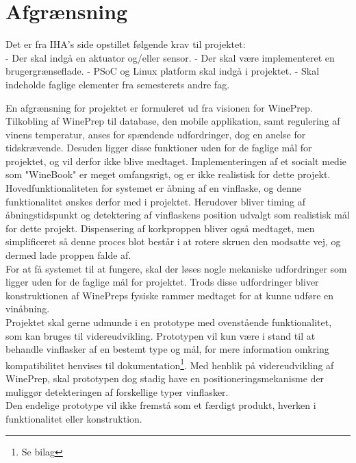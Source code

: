 \chapter{Afgrænsning}
Det er fra IHA's side opstillet følgende krav til projektet:\\
- Der skal indgå en aktuator og/eller sensor.
- Der skal være implementeret en brugergrænseflade.
- PSoC og Linux platform skal indgå i projektet.
- Skal indeholde faglige elementer fra semesterets andre fag.

En afgrænsning for projektet er formuleret ud fra visionen for WinePrep. Tilkobling af WinePrep til database, den mobile applikation, samt regulering af vinens temperatur, anses for spændende udfordringer, dog en anelse for tidskrævende. Desuden ligger disse funktioner uden for de faglige mål for projektet, og vil derfor ikke blive medtaget. Implementeringen af et socialt medie som "WineBook" er meget omfangsrigt, og er ikke realistisk for dette projekt.\\

Hovedfunktionaliteten for systemet er åbning af en vinflaske, og denne funktionalitet ønskes derfor med i projektet. Herudover bliver timing af åbningstidspunkt og detektering af vinflaskens position udvalgt som realistisk mål for dette projekt. Dispensering af korkproppen bliver også medtaget, men simplificeret så denne proces blot består i at rotere skruen den modsatte vej, og dermed lade proppen falde af.\\

For at få systemet til at fungere, skal der løses nogle mekaniske udfordringer som ligger uden for de faglige mål for projektet. Trods disse udfordringer bliver konstruktionen af WinePreps fysiske rammer medtaget for at kunne udføre en vinåbning.\\

Projektet skal gerne udmunde i en prototype med ovenstående funktionalitet, som kan bruges til videreudvikling. Prototypen vil kun være i stand til at behandle vinflasker af en bestemt type og mål, for mere information omkring kompatibilitet henvises til dokumentation\footnote{Se bilag}. Med henblik på videreudvikling af WinePrep, skal prototypen dog stadig have en positioneringsmekanisme der muliggør detekteringen af forskellige typer vinflasker.\\ 

Den endelige prototype vil ikke fremstå som et færdigt produkt, hverken i funktionalitet eller konstruktion.